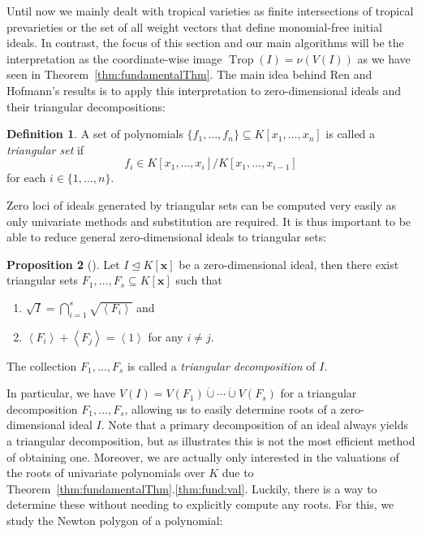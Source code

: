 \documentclass[
  paper=a4,
  titlepage,
  bibliography=totoc,
  pagesize=pdftex
]{scrartcl}
\numberwithin{figure}{section}
\numberwithin{equation}{section}
\numberwithin{table}{section}
\newcommand*\dotcup{\mathbin{\dot{\cup}}}
\newcommand*\ideal[1]{\left\langle #1 \right\rangle}
\let\vec\mathbf
\let\idealof\trianglelefteq
\DeclareMathOperator{\Trop}{Trop}
\theoremstyle{definition}
\newtheorem{definition}{Definition}
\newtheorem{proposition}[definition]{Proposition}
\numberwithin{definition}{section}
\begin{document}
Until now we mainly dealt with tropical varieties as finite intersections of tropical
prevarieties or the set of all weight vectors that define monomial-free initial ideals. In
contrast, the focus of this section and our main algorithms will be the interpretation as
the coordinate-wise image $\Trop(I) = \nu(V(I))$ as we have seen in
Theorem~\ref{thm:fundamentalThm}. The main idea behind Ren and Hofmann's results is to
apply this interpretation to zero-dimensional ideals and their triangular decompositions:

\begin{definition}
  \label{def:triangSet}
  A set of polynomials $\{ f_1, \dots, f_n \} \subseteq K[x_1, \dots, x_n]$ is called a
  \emph{triangular set} if
  \[
    f_i \in K[x_1, \dots, x_i] / K[x_1, \dots, x_{i-1}]
  \]
  for each $i \in \{1, \dots, n\}$.
\end{definition}

Zero loci of ideals generated by triangular sets can be computed very easily as only
univariate methods and substitution are required. It is thus important to be able to
reduce general zero-dimensional ideals to triangular sets:

\begin{proposition}[{\cite[Corollary~4.7.4]{singIntro}}]
  Let $I \idealof K[\vec x]$ be a zero-dimensional ideal, then there exist triangular sets
  $F_1, \dots, F_s \subseteq K[\vec x]$ such that
  \begin{enumerate}
    \item $\sqrt I = \bigcap_{i=1}^s \sqrt{\ideal{F_i}}$ and
    \item $\ideal{F_i} + \ideal{F_j} = \ideal1$ for any $i\neq j$.
  \end{enumerate}
  The collection $F_1, \dots, F_s$ is called a \emph{triangular decomposition} of $I$.
  \label{prp:triang}
\end{proposition}

In particular, we have $V(I) = V(F_1) \dotcup \cdots \dotcup V(F_s)$ for a triangular
decomposition $F_1, \dots, F_s$, allowing us to easily determine roots of a
zero-dimensional ideal $I$. Note that a primary decomposition of an ideal always yields a
triangular decomposition, but as \cite[Lemma~4.7.5]{singIntro} illustrates this is not the
most efficient method of obtaining one. Moreover, we are actually only interested in the
valuations of the roots of univariate polynomials over $K$ due to
Theorem~\ref{thm:fundamentalThm}.\ref{thm:fund:val}. Luckily, there is a way to determine
these without needing to explicitly compute any roots. For this, we study the Newton
polygon of a polynomial:
\end{document}
